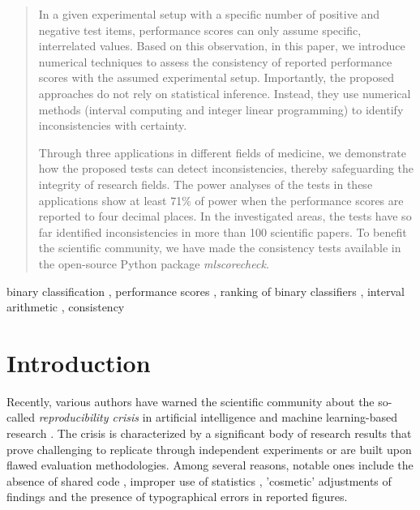 \documentclass[3p, times]{elsarticle}
\begin{document}
\begin{frontmatter}
\begin{abstract}
{
In a given experimental setup with a specific number of positive and negative test items, performance scores can only assume specific, interrelated values. 
Based on this observation, in this paper, we introduce numerical techniques to assess the consistency of reported performance scores with the assumed experimental setup. Importantly, the proposed approaches do not rely on statistical inference. Instead, they use numerical methods (interval computing and integer linear programming) to identify inconsistencies with certainty.} 

{
Through three applications in different fields of medicine, we demonstrate how the proposed tests can detect inconsistencies, thereby safeguarding the integrity of research fields. The power analyses of the tests in these applications show at least 71\% of power when the performance scores are reported to four decimal places. In the investigated areas, the tests have so far identified inconsistencies in more than 100 scientific papers. To benefit the scientific community, we have made the consistency tests available in the open-source Python package \emph{mlscorecheck}.}

\end{abstract}

\begin{keyword}
binary classification
\sep 
performance scores
\sep
ranking of binary classifiers
\sep 
interval arithmetic
\sep
consistency
\end{keyword}


\end{frontmatter}
        


\thispagestyle{empty}

\section{Introduction}\label{section:Introduction}

Recently, various authors have warned the scientific community about the so-called \emph{reproducibility crisis} in artificial intelligence and machine learning-based research \cite{leakage, reprcrisis, repr0, repr1}. The crisis is characterized by a significant body of research results that prove challenging to replicate through independent experiments or are built upon flawed evaluation methodologies. Among several reasons, notable ones include the absence of shared code \cite{leakage}, improper use of statistics \cite{leakage, staterrors}, 'cosmetic' adjustments of findings \cite{fabrication} and the presence of typographical errors in reported figures.
\end{document}
